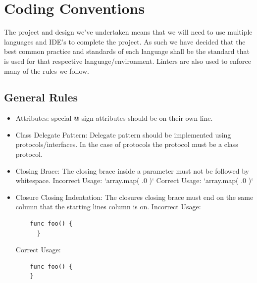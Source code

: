 \documentclass[12pt]{article}
\begin{document}
\section{Coding Conventions}
  \flushleft
  The project and design we've undertaken means that we will need to use multiple languages and IDE's to complete the project. As such we have decided that the best common practice and standards of each language shall be the standard that is used for that respective language/environment. Linters are also used to enforce many of the rules we follow.
  \subsection{General Rules}
  \begin{itemize}
  \item Attributes:\newline
    special @ sign attributes should be on their own line. \newline
     \newline
  \item Class Delegate Pattern:\newline
    Delegate pattern should be implemented using protocols/interfaces. In the case of protocols \newline
    the protocol must be a class protocol. \newline
     \newline
  \item Closing Brace:\newline
    The closing brace inside a parameter must not be followed by whitespace. \newline
    Incorrect Usage: `array.map({ .0 }  )` \newline
    Correct Usage: `array.map({ .0 })` \newline
     \newline
  \item Closure Closing Indentation:\newline
    The closures closing brace must end on the same column that the starting lines column is on. \newline
    Incorrect Usage: \newline
    \begin{verbatim}
    func foo() {
      }
    \end{verbatim}
    Correct Usage: \newline
    \begin{verbatim}
    func foo() {
    }
    \end{verbatim}

\end{itemize}
\end{document}

